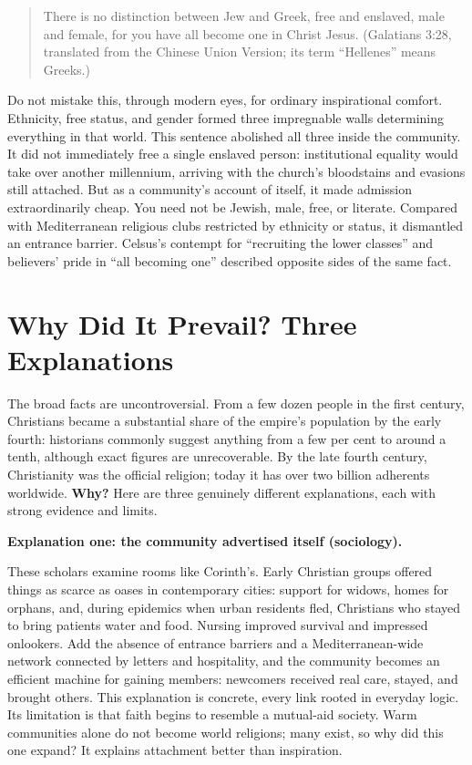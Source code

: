 \begin{quote}
There is no distinction between Jew and Greek, free and enslaved, male and female, for you have all become one in Christ Jesus. (Galatians 3:28, translated from the Chinese Union Version; its term ``Hellenes'' means Greeks.)
\end{quote}
Do not mistake this, through modern eyes, for ordinary inspirational comfort. Ethnicity, free status, and gender formed three impregnable walls determining everything in that world. This sentence abolished all three inside the community. It did not immediately free a single enslaved person: institutional equality would take over another millennium, arriving with the church's bloodstains and evasions still attached. But as a community's account of itself, it made admission extraordinarily cheap. You need not be Jewish, male, free, or literate. Compared with Mediterranean religious clubs restricted by ethnicity or status, it dismantled an entrance barrier. Celsus's contempt for ``recruiting the lower classes'' and believers' pride in ``all becoming one'' described opposite sides of the same fact.

\section{Why Did It Prevail? Three Explanations}
The broad facts are uncontroversial. From a few dozen people in the first century, Christians became a substantial share of the empire's population by the early fourth: historians commonly suggest anything from a few per cent to around a tenth, although exact figures are unrecoverable. By the late fourth century, Christianity was the official religion; today it has over two billion adherents worldwide. \textbf{Why?} Here are three genuinely different explanations, each with strong evidence and limits.

\textbf{Explanation one: the community advertised itself (sociology).}

These scholars examine rooms like Corinth's. Early Christian groups offered things as scarce as oases in contemporary cities: support for widows, homes for orphans, and, during epidemics when urban residents fled, Christians who stayed to bring patients water and food. Nursing improved survival and impressed onlookers. Add the absence of entrance barriers and a Mediterranean-wide network connected by letters and hospitality, and the community becomes an efficient machine for gaining members: newcomers received real care, stayed, and brought others. This explanation is concrete, every link rooted in everyday logic. Its limitation is that faith begins to resemble a mutual-aid society. Warm communities alone do not become world religions; many exist, so why did this one expand? It explains attachment better than inspiration.

